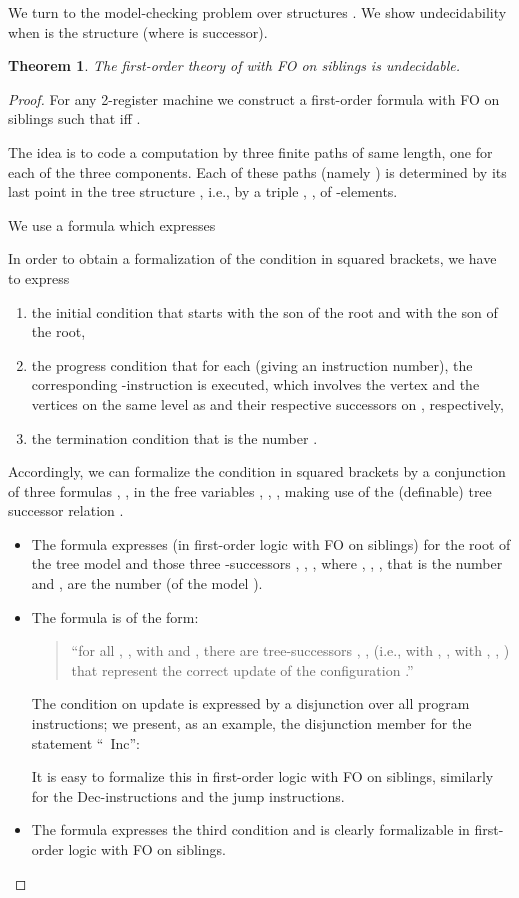 \documentclass[copyright,creativecommons]{eptcs}
\newtheorem{theorem}{Theorem}
\theoremstyle{plain}
\theoremstyle{nonumberplain}
\newtheorem{proof}{Proof}
\begin{document}
We turn to the model-checking problem over structures . We show 
undecidability when 
 is the structure  (where  is successor). 

\begin{theorem}
The first-order theory of  with FO on siblings is undecidable. 
\end{theorem}

\begin{proof}
For any 2-register machine  we construct a first-order formula 
 with FO on siblings such that  
iff . 

The idea is to code a computation 
by three finite paths of same length, one for each of the 
three components. Each of these paths (namely ) is determined by its 
last point in the tree structure , i.e., by a triple , ,  of -elements.

We use a formula which expresses
  

In order to obtain a formalization of the condition in squared brackets, we have to express 
\begin{enumerate}
\item 
the initial condition that  starts with the son  of the root 
and  with the son  of the root, 
\item
the progress condition that for each  (giving an instruction number), the corresponding 
-instruction is executed, which involves the vertex  and the vertices  on the same level as  and their respective successors  
on , respectively, 
\item 
the termination condition that  is the number .
\end{enumerate}

Accordingly, we can formalize the condition in squared brackets by a conjunction of three formulas , ,  in the free variables , , , making use of the (definable) tree successor relation . 
\begin{itemize}
  \item The formula  expresses (in first-order logic with FO on siblings) for the root  of the tree model and those three -successors , , , where , , , that  is the number  and ,  are the number  (of the model ).
  \item The formula  is of the form: 
  \begin{quotation}\noindent
    ``for all , ,  with  and , there are tree-successors , ,  (i.e., with , ,  with , , ) that represent the correct update of the configuration .''
  \end{quotation}
  The condition on update is expressed by a disjunction over all program instructions; we present, as an example, the disjunction member for the statement ``~Inc'':
  
  It is easy to formalize this in first-order logic with FO on siblings, similarly for the Dec-instructions and the jump instructions.
  \item The formula  expresses the third condition and is clearly formalizable in first-order logic with FO on siblings.
\end{itemize}
\end{proof}
\end{document}
